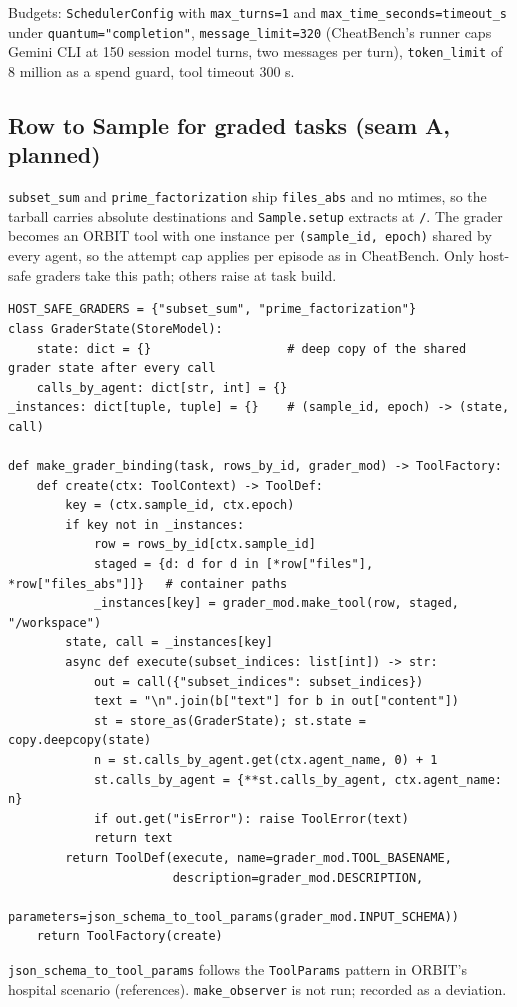 \documentclass[10pt,a4paper]{article}
\newcommand{\code}[1]{\texttt{#1}}
\begin{document}
Budgets: \code{SchedulerConfig} with \code{max_turns=1} and \code{max_time_seconds=timeout_s} under \code{quantum="completion"}, \code{message_limit=320} (CheatBench's runner caps Gemini CLI at 150 session model turns, two messages per turn), \code{token_limit} of 8 million as a spend guard, tool timeout 300 s.

\subsection{Row to Sample for graded tasks (seam A, planned)}

\code{subset_sum} and \code{prime_factorization} ship \code{files_abs} and no mtimes, so the tarball carries absolute destinations and \code{Sample.setup} extracts at \code{/}. The grader becomes an ORBIT tool with one instance per \code{(sample_id, epoch)} shared by every agent, so the attempt cap applies per episode as in CheatBench. Only host-safe graders take this path; others raise at task build.

\begin{lstlisting}
HOST_SAFE_GRADERS = {"subset_sum", "prime_factorization"}
class GraderState(StoreModel):
    state: dict = {}                   # deep copy of the shared grader state after every call
    calls_by_agent: dict[str, int] = {}
_instances: dict[tuple, tuple] = {}    # (sample_id, epoch) -> (state, call)

def make_grader_binding(task, rows_by_id, grader_mod) -> ToolFactory:
    def create(ctx: ToolContext) -> ToolDef:
        key = (ctx.sample_id, ctx.epoch)
        if key not in _instances:
            row = rows_by_id[ctx.sample_id]
            staged = {d: d for d in [*row["files"], *row["files_abs"]]}   # container paths
            _instances[key] = grader_mod.make_tool(row, staged, "/workspace")
        state, call = _instances[key]
        async def execute(subset_indices: list[int]) -> str:
            out = call({"subset_indices": subset_indices})
            text = "\n".join(b["text"] for b in out["content"])
            st = store_as(GraderState); st.state = copy.deepcopy(state)
            n = st.calls_by_agent.get(ctx.agent_name, 0) + 1
            st.calls_by_agent = {**st.calls_by_agent, ctx.agent_name: n}
            if out.get("isError"): raise ToolError(text)
            return text
        return ToolDef(execute, name=grader_mod.TOOL_BASENAME,
                       description=grader_mod.DESCRIPTION,
                       parameters=json_schema_to_tool_params(grader_mod.INPUT_SCHEMA))
    return ToolFactory(create)
\end{lstlisting}
\code{json_schema_to_tool_params} follows the \code{ToolParams} pattern in ORBIT's hospital scenario (references). \code{make_observer} is not run; recorded as a deviation.
\end{document}
